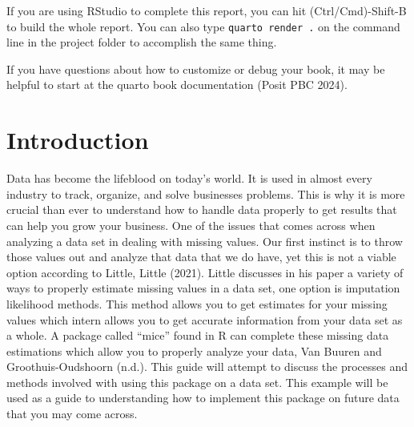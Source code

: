 \documentclass[
  letterpaper,
  DIV=11,
  numbers=noendperiod]{scrreprt}
\begin{document}
\begin{tcolorbox}[enhanced jigsaw, colframe=quarto-callout-caution-color-frame, breakable, opacityback=0, toprule=.15mm, rightrule=.15mm, bottomtitle=1mm, title=\textcolor{quarto-callout-caution-color}{\faFire}\hspace{0.5em}{Building the report}, left=2mm, toptitle=1mm, titlerule=0mm, opacitybacktitle=0.6, colbacktitle=quarto-callout-caution-color!10!white, coltitle=black, arc=.35mm, leftrule=.75mm, bottomrule=.15mm, colback=white]

If you are using RStudio to complete this report, you can hit
(Ctrl/Cmd)-Shift-B to build the whole report. You can also type
\texttt{quarto\ render\ .} on the command line in the project folder to
accomplish the same thing.

If you have questions about how to customize or debug your book, it may
be helpful to start at the quarto book documentation (Posit PBC 2024).

\end{tcolorbox}


\chapter{Introduction}\label{introduction}

Data has become the lifeblood on today's world. It is used in almost
every industry to track, organize, and solve businesses problems. This
is why it is more crucial than ever to understand how to handle data
properly to get results that can help you grow your business. One of the
issues that comes across when analyzing a data set in dealing with
missing values. Our first instinct is to throw those values out and
analyze that data that we do have, yet this is not a viable option
according to Little, Little (2021). Little discusses in his paper a
variety of ways to properly estimate missing values in a data set, one
option is imputation likelihood methods. This method allows you to get
estimates for your missing values which intern allows you to get
accurate information from your data set as a whole. A package called
``mice'' found in R can complete these missing data estimations which
allow you to properly analyze your data, Van Buuren and
Groothuis-Oudshoorn (n.d.). This guide will attempt to discuss the
processes and methods involved with using this package on a data set.
This example will be used as a guide to understanding how to implement
this package on future data that you may come across.
\end{document}
